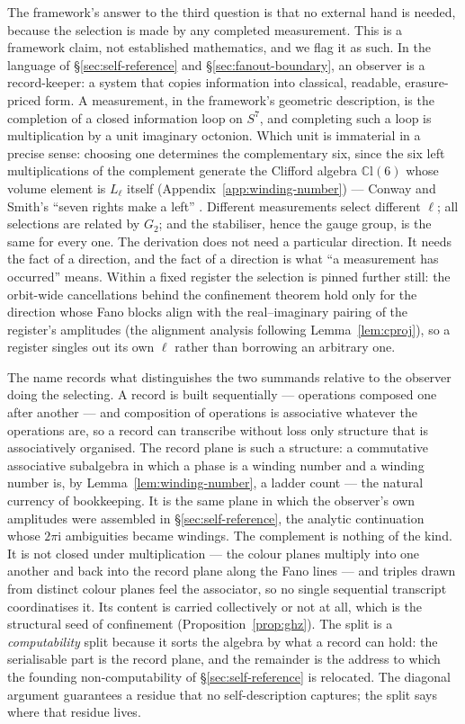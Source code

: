 The framework's answer to the third question is that no external hand is
needed, because the selection is made by any completed measurement. This
is a framework claim, not established mathematics, and we flag it as
such. In the language of \S\ref{sec:self-reference} and
\S\ref{sec:fanout-boundary}, an observer is a record-keeper: a system
that copies information into classical, readable, erasure-priced form. A
measurement, in the framework's geometric description, is the completion
of a closed information loop on $S^7$, and completing such a loop is
multiplication by a unit imaginary octonion. Which unit is immaterial in
a precise sense: choosing one determines the complementary six, since the
six left multiplications of the complement generate the Clifford algebra
$\mathbb{C}\mathrm{l}(6)$ whose volume element is $L_{\ell}$ itself
(Appendix~\ref{app:winding-number}) --- Conway and Smith's ``seven rights
make a left'' \autocite{conwaysmith2003}. Different measurements select
different $\ell$; all selections are related by $G_2$; and the
stabiliser, hence the gauge group, is the same for every one. The
derivation does not need a particular direction. It needs the fact of a
direction, and the fact of a direction is what ``a measurement has
occurred'' means. Within a fixed register the selection is pinned
further still: the orbit-wide cancellations behind the confinement
theorem hold only for the direction whose Fano blocks align with the
real--imaginary pairing of the register's amplitudes (the alignment
analysis following Lemma~\ref{lem:cproj}), so a register singles out its
own $\ell$ rather than borrowing an arbitrary one.

The name records what distinguishes the two summands relative to the
observer doing the selecting. A record is built sequentially ---
operations composed one after another --- and composition of operations
is associative whatever the operations are, so a record can transcribe
without loss only structure that is associatively organised. The record
plane is such a structure: a commutative associative subalgebra in which
a phase is a winding number and a winding number is, by
Lemma~\ref{lem:winding-number}, a ladder count --- the natural currency
of bookkeeping. It is the same plane in which the observer's own
amplitudes were assembled in \S\ref{sec:self-reference}, the analytic
continuation whose $2\pi\mathrm{i}$ ambiguities became windings. The
complement is nothing of the kind. It is not closed under multiplication
--- the colour planes multiply into one another and back into the record
plane along the Fano lines --- and triples drawn from distinct colour
planes feel the associator, so no single sequential transcript
coordinatises it. Its content is carried collectively or not at all,
which is the structural seed of confinement
(Proposition~\ref{prop:ghz}). The split is a \emph{computability} split
because it sorts the algebra by what a record can hold: the serialisable
part is the record plane, and the remainder is the address to which the
founding non-computability of \S\ref{sec:self-reference} is relocated.
The diagonal argument guarantees a residue that no self-description
captures; the split says where that residue lives.

